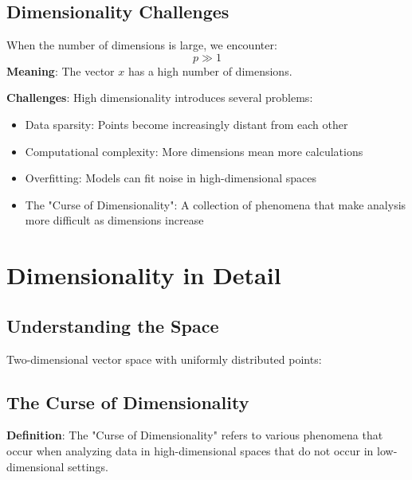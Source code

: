 \documentclass[12pt]{article}
\begin{document}
\subsection{Dimensionality Challenges}
When the number of dimensions is large, we encounter:
\[
    p \gg 1
\]
\textbf{Meaning}: The vector $x$ has a high number of dimensions.

\textbf{Challenges}: High dimensionality introduces several problems:
\begin{itemize}
    \item Data sparsity: Points become increasingly distant from each other
    \item Computational complexity: More dimensions mean more calculations
    \item Overfitting: Models can fit noise in high-dimensional spaces
    \item The "Curse of Dimensionality": A collection of phenomena that make analysis more difficult as dimensions increase
\end{itemize}

\section{Dimensionality in Detail}
\subsection{Understanding the Space}

Two-dimensional vector space with uniformly distributed points:

\begin{center}
\end{center}

\subsection{The Curse of Dimensionality}
\textbf{Definition}: The "Curse of Dimensionality" refers to various phenomena that occur when analyzing data in high-dimensional spaces that do not occur in low-dimensional settings.
\end{document}
